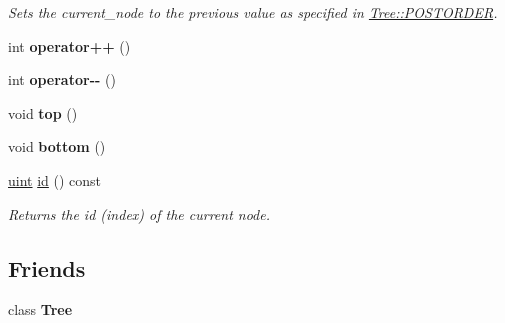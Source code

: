 \begin{DoxyCompactItemize}
\begin{DoxyCompactList}\small\item\em Sets the {\ttfamily current\+\_\+node} to the previous value as specified in \hyperlink{classpruner_1_1Tree_a547937e845fdbceafae4db25cd74f880}{Tree\+::\+P\+O\+S\+T\+O\+R\+D\+ER}. \end{DoxyCompactList}\item 
int {\bfseries operator++} ()\hypertarget{classpruner_1_1TreeIterator_aed2ad905c7c0cef8c2fd8e012c67dc5c}{}\label{classpruner_1_1TreeIterator_aed2ad905c7c0cef8c2fd8e012c67dc5c}

\item 
int {\bfseries operator-\/-\/} ()\hypertarget{classpruner_1_1TreeIterator_a08d18c38de3157a78b9d02899a605ed8}{}\label{classpruner_1_1TreeIterator_a08d18c38de3157a78b9d02899a605ed8}

\item 
void {\bfseries top} ()\hypertarget{classpruner_1_1TreeIterator_a41f74b1ac47cd05ce7e08b46c93034f1}{}\label{classpruner_1_1TreeIterator_a41f74b1ac47cd05ce7e08b46c93034f1}

\item 
void {\bfseries bottom} ()\hypertarget{classpruner_1_1TreeIterator_a1c8244cded3c2a573d2914549a19e177}{}\label{classpruner_1_1TreeIterator_a1c8244cded3c2a573d2914549a19e177}

\item 
\hyperlink{typedefs_8h_a91ad9478d81a7aaf2593e8d9c3d06a14}{uint} \hyperlink{classpruner_1_1TreeIterator_ae76ec4f2c1390d72889f78a51d65d19c}{id} () const \hypertarget{classpruner_1_1TreeIterator_ae76ec4f2c1390d72889f78a51d65d19c}{}\label{classpruner_1_1TreeIterator_ae76ec4f2c1390d72889f78a51d65d19c}

\begin{DoxyCompactList}\small\item\em Returns the id (index) of the current node. \end{DoxyCompactList}\end{DoxyCompactItemize}
\subsection*{Friends}
\begin{DoxyCompactItemize}
\item 
class {\bfseries Tree}\hypertarget{classpruner_1_1TreeIterator_a4b682814d14447120dd184fd300deade}{}\label{classpruner_1_1TreeIterator_a4b682814d14447120dd184fd300deade}

\end{DoxyCompactItemize}


